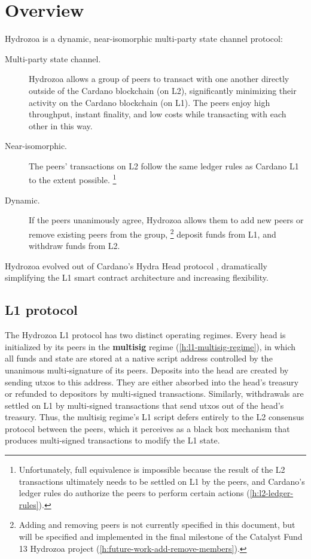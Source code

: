 \documentclass[../hydrozoa.tex]{subfiles}
\begin{document}
\chapter*{Overview}%
\label{h:overview-introduction}%
%

Hydrozoa is a dynamic, near-isomorphic multi-party state channel protocol:
\begin{description}
  \item[Multi-party state channel.] Hydrozoa allows a group of peers to transact with one another directly outside of the Cardano blockchain (on L2), significantly minimizing their activity on the Cardano blockchain (on L1).
    The peers enjoy high throughput, instant finality, and low costs while transacting with each other in this way.
  \item[Near-isomorphic.] The peers' transactions on L2 follow the same ledger rules as Cardano L1 to the extent possible.%
    \footnote{Unfortunately, full equivalence is impossible because the result of the L2 transactions ultimately needs to be settled on L1 by the peers, and Cardano's ledger rules do authorize the peers to perform certain actions (\cref{h:l2-ledger-rules}).}
  \item[Dynamic.] If the peers unanimously agree, Hydrozoa allows them to add new peers or remove existing peers from the group,%
    \footnote{Adding and removing peers is not currently specified in this document, but will be specified and implemented in the final milestone of the Catalyst Fund 13 Hydrozoa project \citep{FlerovskyCatalystMilestonesHydrozoa2024} (\cref{h:future-work-add-remove-members}).}
    deposit funds from L1, and withdraw funds from L2.
\end{description}
Hydrozoa evolved out of Cardano's Hydra Head protocol \citep{NagelEtAlHydraHeadV1Specification2024}, dramatically simplifying the L1 smart contract architecture and increasing flexibility.

\section*{L1 protocol}%
\label{h:overview-l1-protocol}%
%

The Hydrozoa L1 protocol has two distinct operating regimes.
Every head is initialized by its peers in the \textbf{multisig} regime (\cref{h:l1-multisig-regime}), in which all funds and state are stored at a native script address controlled by the unanimous multi-signature of its peers.
Deposits into the head are created by sending utxos to this address. They are either absorbed into the head's treasury or refunded to depositors by multi-signed transactions.
Similarly, withdrawals are settled on L1 by multi-signed transactions that send utxos out of the head's treasury.
Thus, the multisig regime's L1 script defers entirely to the L2 consensus protocol between the peers, which it perceives as a black box mechanism that produces multi-signed transactions to modify the L1 state.
\end{document}
